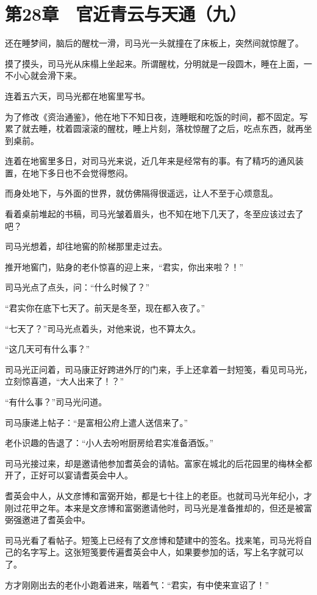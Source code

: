 \section{第28章　官近青云与天通（九）}

还在睡梦间，脑后的醒枕一滑，司马光一头就撞在了床板上，突然间就惊醒了。

摸了摸头，司马光从床榻上坐起来。所谓醒枕，分明就是一段圆木，睡在上面，一不小心就会滑下来。

连着五六天，司马光都在地窖里写书。

为了修改《资治通鉴》，他在地下不知日夜，连睡眠和吃饭的时间，都不固定。写累了就去睡，枕着圆滚滚的醒枕，睡上片刻，落枕惊醒了之后，吃点东西，就再坐到桌前。

连着在地窖里多日，对司马光来说，近几年来是经常有的事。有了精巧的通风装置，在地下多日也不会觉得憋闷。

而身处地下，与外面的世界，就仿佛隔得很遥远，让人不至于心烦意乱。

看着桌前堆起的书稿，司马光皱着眉头，也不知在地下几天了，冬至应该过去了吧？

司马光想着，却往地窖的阶梯那里走过去。

推开地窖门，贴身的老仆惊喜的迎上来，“君实，你出来啦？！”

司马光点了点头，问：“什么时候了？”

“君实你在底下七天了。前天是冬至，现在都入夜了。”

“七天了？”司马光点着头，对他来说，也不算太久。

“这几天可有什么事？”

司马光正问着，司马康正好跨进外厅的门来，手上还拿着一封短笺，看见司马光，立刻惊喜道，“大人出来了！？”

“有什么事？”司马光问道。

司马康递上帖子：“是富相公府上遣人送信来了。”

老仆识趣的告退了：“小人去吩咐厨房给君实准备酒饭。”

司马光接过来，却是邀请他参加耆英会的请帖。富家在城北的后花园里的梅林全都开了，正好可以宴请耆英会中人。

耆英会中人，从文彦博和富弼开始，都是七十往上的老臣。也就司马光年纪小，才刚过花甲之年。本来是文彦博和富弼邀请他时，司马光是准备推却的，但还是被富弼强邀进了耆英会中。

司马光看了看帖子。短笺上已经有了文彦博和楚建中的签名。找来笔，司马光将自己的名字写上。这张短笺要传遍耆英会中人，如果要参加的话，写上名字就可以了。

方才刚刚出去的老仆小跑着进来，喘着气：“君实，有中使来宣诏了！”

